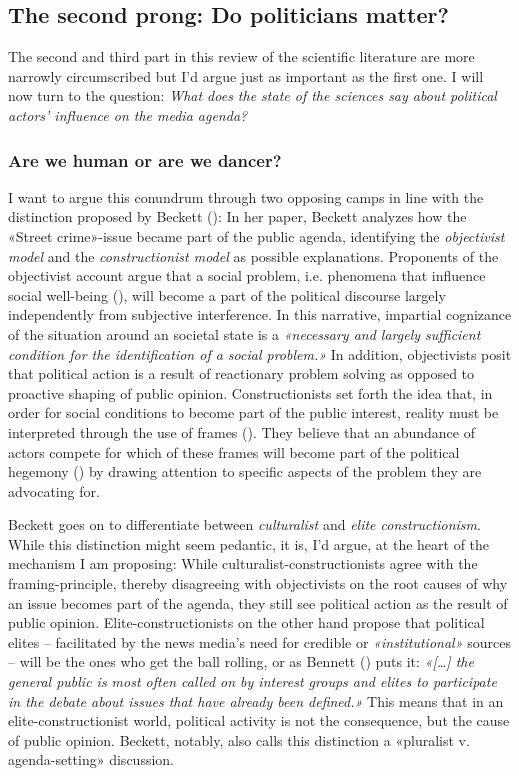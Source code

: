 \documentclass[11pt,a4paper]{article}
\begin{document}
\subsection{The second prong: Do politicians matter?}
The second and third part in this review of the scientific literature are more narrowly circumscribed but I’d argue just as important as the first one. I will now turn to the question: \textit{What does the state of the sciences say about political actors’ influence on the media agenda?} 


\subsubsection{Are we human or are we dancer?}
I want to argue this conundrum through two opposing camps in line with the distinction proposed by Beckett (\citeyear{beckett_setting_1994}): In her paper, Beckett analyzes how the «Street crime»-issue became part of the public agenda, identifying the \textit{objectivist model} and the \textit{constructionist model }as possible explanations. Proponents of the objectivist account argue that a social problem, i.e. phenomena that influence social well-being (\cite{manis_concept_1974}), will become a part of the political discourse largely independently from subjective interference. In this narrative, impartial cognizance of the situation around an societal state is a \textit{«necessary and largely sufficient condition for the identification of a social problem.»} In addition, objectivists posit that political action is a result of reactionary problem solving as opposed to proactive shaping of public opinion. Constructionists set forth the idea that, in order for social conditions to become part of the public interest, reality must be interpreted through the use of frames (\cite{hall_policing_1978}). They believe that an abundance of actors compete for which of these frames will become part of the political hegemony (\cite{edelman_constructing_1988,gamson_media_1992}) by drawing attention to specific aspects of the problem they are advocating for. 

Beckett goes on to differentiate between \textit{culturalist} and \textit{elite constructionism}. While this distinction might seem pedantic, it is, I’d argue, at the heart of the mechanism I am proposing: While culturalist-constructionists agree with the framing-principle, thereby disagreeing with objectivists on the root causes of why an issue becomes part of the agenda, they still see political action as the result of public opinion. Elite-constructionists on the other hand propose that political elites – facilitated by the news media’s need for credible or \textit{«institutional»} sources – will be the ones who get the ball rolling, or as Bennett (\cite{bennett_public_1980}) puts it: \textit{«[…] the general public is most often called on by interest groups and elites to participate in the debate about issues that have already been defined.»} This means that in an elite-constructionist world, political activity is not the consequence, but the cause of public opinion. Beckett, notably, also calls this distinction a «pluralist v. agenda-setting» discussion.
\end{document}
